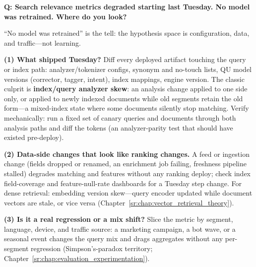\begin{interviewq}

\end{interviewq}


\begin{interviewq}
\textbf{Q: Search relevance metrics degraded starting last Tuesday. No model was retrained. Where do you look?}

 \quad {} \quad \badgefreq{\freqmed}

\stronganswer

``No model was retrained'' is the tell: the hypothesis space is configuration, data, and traffic---not learning.

\textbf{(1) What shipped Tuesday?} Diff every deployed artifact touching the query or index path: analyzer/tokenizer configs, synonym and no-touch lists, QU model versions (corrector, tagger, intent), index mappings, engine version. The classic culprit is \textbf{index/query analyzer skew}: an analysis change applied to one side only, or applied to newly indexed documents while old segments retain the old form---a mixed-index state where some documents silently stop matching. Verify mechanically: run a fixed set of canary queries and documents through both analysis paths and diff the tokens (an analyzer-parity test that should have existed pre-deploy).

\textbf{(2) Data-side changes that look like ranking changes.} A feed or ingestion change (fields dropped or renamed, an enrichment job failing, freshness pipeline stalled) degrades matching and features without any ranking deploy; check index field-coverage and feature-null-rate dashboards for a Tuesday step change. For dense retrieval: embedding version skew---query encoder updated while document vectors are stale, or vice versa (Chapter~\ref{sr:chap:vector_retrieval_theory}).

\textbf{(3) Is it a real regression or a mix shift?} Slice the metric by segment, language, device, and traffic source: a marketing campaign, a bot wave, or a seasonal event changes the query mix and drags aggregates without any per-segment regression (Simpson's-paradox territory; Chapter~\ref{sr:chap:evaluation_experimentation}).


\end{interviewq}
